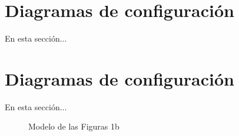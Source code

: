 \thispagestyle{empty}
\setcounter{figure}{0}

\section{Diagramas de configuración}
En esta sección...


\section{Diagramas de configuración}
En esta sección...
\begin{figure}[!htbp]
    \centering
    \caption{Modelo de las Figuras 1b }
    \label{fig:figura1aes}
\end{figure}